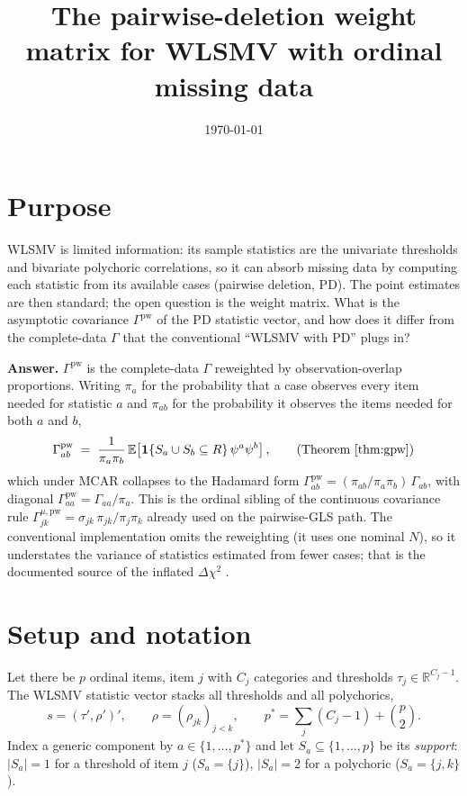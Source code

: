 \documentclass[11pt]{article}
\title{The pairwise-deletion weight matrix for WLSMV with ordinal
missing data}
\author{}
\date{\today}
\newcommand{\E}{\mathbb{E}}
\newcommand{\one}{\mathbf{1}}
\newcommand{\pw}{\mathrm{pw}}
\theoremstyle{plain}
\theoremstyle{remark}
\begin{document}
\maketitle

\section*{Purpose}

WLSMV is limited information: its sample statistics are the univariate
thresholds and bivariate polychoric correlations, so it can absorb missing
data by computing each statistic from its available cases (pairwise deletion,
PD). The point estimates are then standard; the open question is the weight
matrix. What is the asymptotic covariance $\Gamma^{\pw}$ of the PD statistic
vector, and how does it differ from the complete-data $\Gamma$ that the
conventional ``WLSMV with PD'' plugs in?

\textbf{Answer.} $\Gamma^{\pw}$ is the complete-data $\Gamma$ reweighted by
observation-overlap proportions. Writing $\pi_a$ for the probability that a
case observes every item needed for statistic $a$ and $\pi_{ab}$ for the
probability it observes the items needed for both $a$ and $b$,
\[
  \Gamma^{\pw}_{ab}
  \;=\;
  \frac{1}{\pi_a \pi_b}\,
  \E\!\left[\one\{S_a\cup S_b \subseteq R\}\,\psi^a\psi^b\right],
  \qquad\text{(Theorem~\ref{thm:gpw})}
\]
which under MCAR collapses to the Hadamard form
$\Gamma^{\pw}_{ab} = (\pi_{ab}/\pi_a\pi_b)\,\Gamma_{ab}$, with diagonal
$\Gamma^{\pw}_{aa} = \Gamma_{aa}/\pi_a$. This is the ordinal sibling of the
continuous covariance rule $\Gamma^{\mu,\pw}_{jk}=\sigma_{jk}\,\pi_{jk}/\pi_j\pi_k$
already used on the pairwise-GLS path. The conventional implementation omits
the reweighting (it uses one nominal $N$), so it understates the variance of
statistics estimated from fewer cases; that is the documented source of the
inflated $\Delta\chi^2$ \cite{chen2020}.

\section*{Setup and notation}

Let there be $p$ ordinal items, item $j$ with $C_j$ categories and thresholds
$\tau_j\in\mathbb{R}^{C_j-1}$. The WLSMV statistic vector stacks all thresholds
and all polychorics,
\[
  s = (\tau', \rho')',
  \qquad
  \rho = (\rho_{jk})_{j<k},
  \qquad
  p^\ast = \sum_j (C_j-1) + \binom{p}{2}.
\]
Index a generic component by $a\in\{1,\dots,p^\ast\}$ and let
$S_a\subseteq\{1,\dots,p\}$ be its \emph{support}: $|S_a|=1$ for a threshold
of item $j$ ($S_a=\{j\}$), $|S_a|=2$ for a polychoric ($S_a=\{j,k\}$).
\end{document}
